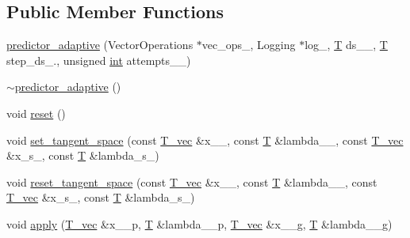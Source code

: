 \subsection*{Public Member Functions}
\begin{DoxyCompactItemize}
\item 
\hyperlink{classcontinuation_1_1predictor__adaptive_a7d48f716ecd9b2b78d415d63c1b93e7b}{predictor\-\_\-adaptive} (Vector\-Operations $\ast$vec\-\_\-ops\-\_\-, Logging $\ast$log\-\_\-, \hyperlink{classcontinuation_1_1predictor__adaptive_add46ad992055f6fad831be827ae49ddb}{T} ds\-\_\-\_\-, \hyperlink{classcontinuation_1_1predictor__adaptive_add46ad992055f6fad831be827ae49ddb}{T} step\-\_\-ds\-\_., unsigned \hyperlink{classint}{int} attempts\-\_\-\_)
\item 
\hyperlink{classcontinuation_1_1predictor__adaptive_ac802d98184a468c60ad897cd4bcf88ea}{$\sim$predictor\-\_\-adaptive} ()
\item 
void \hyperlink{classcontinuation_1_1predictor__adaptive_ac8df32b6ab749bc81d4152e90d384e0d}{reset} ()
\item 
void \hyperlink{classcontinuation_1_1predictor__adaptive_abbaa2df573af877477af91066b5fd0a1}{set\-\_\-tangent\-\_\-space} (const \hyperlink{classcontinuation_1_1predictor__adaptive_ae84bcc7dd9cf2c85cd18bbb0de1c42b2}{T\-\_\-vec} \&x\-\_\-\_\-, const \hyperlink{classcontinuation_1_1predictor__adaptive_add46ad992055f6fad831be827ae49ddb}{T} \&lambda\-\_\-\_\-, const \hyperlink{classcontinuation_1_1predictor__adaptive_ae84bcc7dd9cf2c85cd18bbb0de1c42b2}{T\-\_\-vec} \&x\-\_\-s\-\_\-, const \hyperlink{classcontinuation_1_1predictor__adaptive_add46ad992055f6fad831be827ae49ddb}{T} \&lambda\-\_\-s\-\_\-)
\item 
void \hyperlink{classcontinuation_1_1predictor__adaptive_a08df60dddbb96717993212a5ffa767fa}{reset\-\_\-tangent\-\_\-space} (const \hyperlink{classcontinuation_1_1predictor__adaptive_ae84bcc7dd9cf2c85cd18bbb0de1c42b2}{T\-\_\-vec} \&x\-\_\-\_\-, const \hyperlink{classcontinuation_1_1predictor__adaptive_add46ad992055f6fad831be827ae49ddb}{T} \&lambda\-\_\-\_\-, const \hyperlink{classcontinuation_1_1predictor__adaptive_ae84bcc7dd9cf2c85cd18bbb0de1c42b2}{T\-\_\-vec} \&x\-\_\-s\-\_\-, const \hyperlink{classcontinuation_1_1predictor__adaptive_add46ad992055f6fad831be827ae49ddb}{T} \&lambda\-\_\-s\-\_\-)
\item 
void \hyperlink{classcontinuation_1_1predictor__adaptive_a25dd64f793f353653a37af8ba753338a}{apply} (\hyperlink{classcontinuation_1_1predictor__adaptive_ae84bcc7dd9cf2c85cd18bbb0de1c42b2}{T\-\_\-vec} \&x\-\_\-\_\-p, \hyperlink{classcontinuation_1_1predictor__adaptive_add46ad992055f6fad831be827ae49ddb}{T} \&lambda\-\_\-\_\-p, \hyperlink{classcontinuation_1_1predictor__adaptive_ae84bcc7dd9cf2c85cd18bbb0de1c42b2}{T\-\_\-vec} \&x\-\_\-\_\-g, \hyperlink{classcontinuation_1_1predictor__adaptive_add46ad992055f6fad831be827ae49ddb}{T} \&lambda\-\_\-\_\-g)

\end{DoxyCompactItemize}
